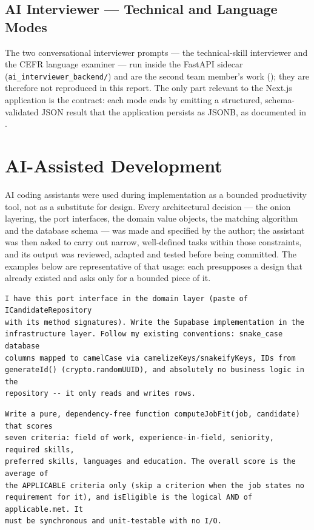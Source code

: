 \subsection{AI Interviewer --- Technical and Language Modes}
\label{app:prompts-interview}

The two conversational interviewer prompts --- the technical-skill interviewer
and the CEFR language examiner --- run inside the FastAPI sidecar
(\texttt{ai\_interviewer\_backend/}) and are the second team member's work
(); they are therefore not reproduced in this report. The only
part relevant to the Next.js application is the contract: each mode ends by
emitting a structured, schema-validated JSON result that the application
persists as JSONB, as documented in .


\section{AI-Assisted Development}
\label{app:prompts-development}

AI coding assistants were used during implementation as a bounded productivity
tool, not as a substitute for design. Every architectural decision --- the
onion layering, the port interfaces, the domain value objects, the matching
algorithm and the database schema --- was made and specified by the author; the
assistant was then asked to carry out narrow, well-defined tasks within those
constraints, and its output was reviewed, adapted and tested before being
committed. The examples below are representative of that usage: each presupposes
a design that already existed and asks only for a bounded piece of it.

\begin{lstlisting}[caption={Generating a repository implementation against a defined port.},label={lst:dev-repo}]
I have this port interface in the domain layer (paste of ICandidateRepository
with its method signatures). Write the Supabase implementation in the
infrastructure layer. Follow my existing conventions: snake_case database
columns mapped to camelCase via camelizeKeys/snakeifyKeys, IDs from
generateId() (crypto.randomUUID), and absolutely no business logic in the
repository -- it only reads and writes rows.
\end{lstlisting}

\begin{lstlisting}[caption={Implementing a pure algorithm from an explicit specification.},label={lst:dev-jobfit}]
Write a pure, dependency-free function computeJobFit(job, candidate) that scores
seven criteria: field of work, experience-in-field, seniority, required skills,
preferred skills, languages and education. The overall score is the average of
the APPLICABLE criteria only (skip a criterion when the job states no
requirement for it), and isEligible is the logical AND of applicable.met. It
must be synchronous and unit-testable with no I/O.
\end{lstlisting}


